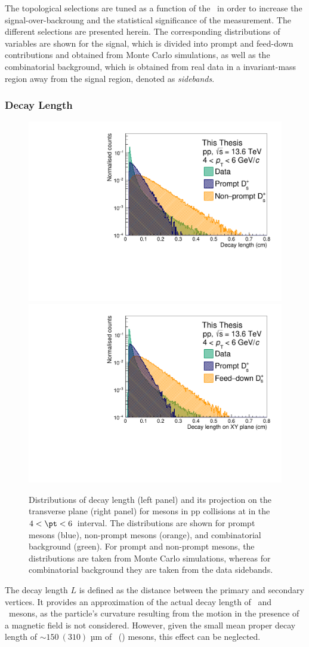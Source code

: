 The topological selections are tuned as a function of the \pt\ in order to increase the signal-over-backroung and the statistical significance of the measurement. The different selections are presented herein. The corresponding distributions of variables are shown for the signal, which is divided into prompt and feed-down contributions and obtained from Monte Carlo simulations, as well as the combinatorial background, which is obtained from real data in a invariant-mass region away from the signal region, denoted as \emph{sidebands}.

\subsubsection{Decay Length}
\begin{figure}
    \centering
    \includegraphics[width=0.48\linewidth]{Figures/Chapter 4/DecayLength.pdf}
    \includegraphics[width=0.48\linewidth]{Figures/Chapter 4/DecayLengthXY.pdf}
    \caption{Distributions of decay length (left panel) and its projection on the transverse plane (right panel)  for \ds mesons in pp collisions at \thirteen in the $4 < \pt < 6$~\gevc interval. The distributions
    are shown for prompt \ds mesons (blue), non-prompt \ds mesons (orange), and combinatorial background
    (green). For prompt and non-prompt \ds mesons, the distributions are taken from Monte Carlo
    simulations, whereas for combinatorial background they are taken from the data sidebands.}
    \label{fig:DecayLength}
\end{figure}
The decay length $L$ is defined as the distance between the primary and secondary vertices. It provides an approximation of the actual decay length of \ds\ and \dpl\ mesons, as the particle's curvature resulting from the motion in the presence of a magnetic field is not considered. However, given the small mean proper decay length of $\sim 150~(310)$ µm of \ds\ (\dpl) mesons, this effect can be neglected. 

